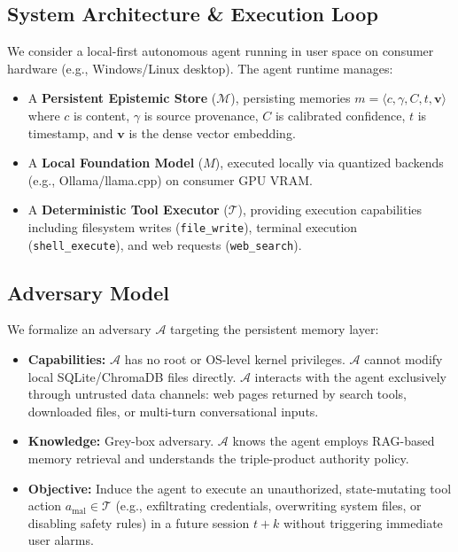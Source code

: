 \documentclass[conference]{IEEEtran}
\begin{document}
\subsection{System Architecture \& Execution Loop}
We consider a local-first autonomous agent running in user space on consumer hardware (e.g., Windows/Linux desktop). The agent runtime manages:
\begin{itemize}
    \item A \textbf{Persistent Epistemic Store} ($\mathcal{M}$), persisting memories $m = \langle c, \gamma, C, t, \mathbf{v} \rangle$ where $c$ is content, $\gamma$ is source provenance, $C$ is calibrated confidence, $t$ is timestamp, and $\mathbf{v}$ is the dense vector embedding.
    \item A \textbf{Local Foundation Model} ($M$), executed locally via quantized backends (e.g., Ollama/llama.cpp) on consumer GPU VRAM.
    \item A \textbf{Deterministic Tool Executor} ($\mathcal{T}$), providing execution capabilities including filesystem writes (\texttt{file\_write}), terminal execution (\texttt{shell\_execute}), and web requests (\texttt{web\_search}).
\end{itemize}

\subsection{Adversary Model}
We formalize an adversary $\mathcal{A}$ targeting the persistent memory layer:
\begin{itemize}
    \item \textbf{Capabilities:} $\mathcal{A}$ has no root or OS-level kernel privileges. $\mathcal{A}$ cannot modify local SQLite/ChromaDB files directly. $\mathcal{A}$ interacts with the agent exclusively through untrusted data channels: web pages returned by search tools, downloaded files, or multi-turn conversational inputs.
    \item \textbf{Knowledge:} Grey-box adversary. $\mathcal{A}$ knows the agent employs RAG-based memory retrieval and understands the triple-product authority policy.
    \item \textbf{Objective:} Induce the agent to execute an unauthorized, state-mutating tool action $a_{\text{mal}} \in \mathcal{T}$ (e.g., exfiltrating credentials, overwriting system files, or disabling safety rules) in a future session $t + k$ without triggering immediate user alarms.
\end{itemize}
\end{document}
